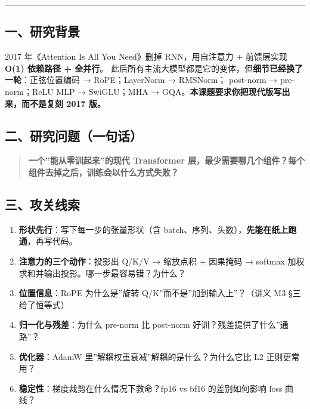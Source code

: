 \documentclass[
  chinese,
  11pt,
]{ctexart}
\providecommand{\tightlist}{%
  \setlength{\itemsep}{0pt}\setlength{\parskip}{0pt}}
\begin{document}
\begin{center}\rule{0.5\linewidth}{0.5pt}\end{center}

\subsection{一、研究背景}\label{ux4e00ux7814ux7a76ux80ccux666f}

2017 年《Attention Is All You Need》删掉 RNN，用自注意力 + 前馈层实现 \textbf{O(1) 依赖路径 + 全并行}。 此后所有主流大模型都是它的变体，但\textbf{细节已经换了一轮}：正弦位置编码 → RoPE；LayerNorm → RMSNorm； post-norm → pre-norm；ReLU MLP → SwiGLU；MHA → GQA。\textbf{本课题要求你把现代版写出来，而不是复刻 2017 版。}

\subsection{二、研究问题（一句话）}\label{ux4e8cux7814ux7a76ux95eeux9898ux4e00ux53e5ux8bdd}

\begin{quote}
\textbf{一个''能从零训起来''的现代 Transformer 层，最少需要哪几个组件？每个组件去掉之后，训练会以什么方式失败？}
\end{quote}

\subsection{三、攻关线索}\label{ux4e09ux653bux5173ux7ebfux7d22}

\begin{enumerate}
\def\labelenumi{\arabic{enumi}.}
\tightlist
\item
  \textbf{形状先行}：写下每一步的张量形状（含 batch、序列、头数），\textbf{先能在纸上跑通}，再写代码。
\item
  \textbf{注意力的三个动作}：投影出 Q/K/V → 缩放点积 + 因果掩码 → softmax 加权求和并输出投影。哪一步最容易错？为什么？
\item
  \textbf{位置信息}：RoPE 为什么是''旋转 Q/K''而不是''加到输入上''？（讲义 M3 §三给了恒等式）
\item
  \textbf{归一化与残差}：为什么 pre-norm 比 post-norm 好训？残差提供了什么''通路''？
\item
  \textbf{优化器}：AdamW 里''解耦权重衰减''解耦的是什么？为什么它比 L2 正则更常用？
\item
  \textbf{稳定性}：梯度裁剪在什么情况下救命？fp16 vs bf16 的差别如何影响 loss 曲线？
\end{enumerate}
\end{document}
